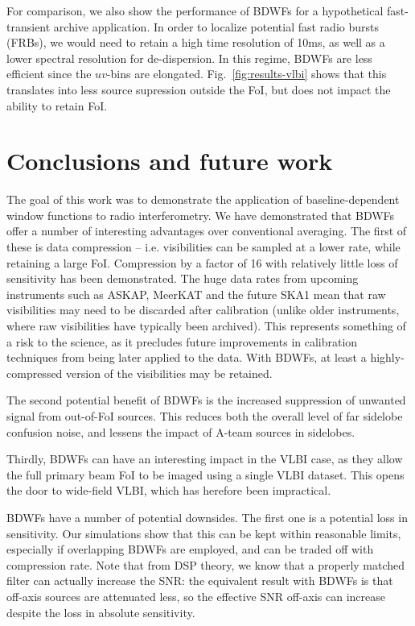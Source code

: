 \documentclass[useAMS,usenatbib]{mn2e}
\begin{document}
For comparison, we also show the performance of BDWFs for a hypothetical fast-transient archive application. In 
order to localize potential fast radio bursts (FRBs), we would need to retain a high time resolution of 10ms, as 
well as a lower spectral resolution for de-dispersion. In this regime, BDWFs are less efficient since the 
$uv$-bins are elongated. Fig.~\ref{fig:results-vlbi} shows that this translates into less source supression outside the FoI, but does not impact the ability to retain FoI.

\section{Conclusions and future work}

The goal of this work was to demonstrate the application of baseline-dependent window functions to radio 
interferometry. We have demonstrated that BDWFs offer a number of interesting advantages over conventional averaging.
The first of these is data compression -- i.e. visibilities can be sampled at a
lower rate, while retaining a large FoI. Compression by a factor of 16 with relatively little loss of sensitivity has been demonstrated. The huge data 
rates from upcoming instruments such as ASKAP, MeerKAT and the future SKA1 mean that raw visibilities may need to be
discarded after calibration (unlike older instruments, where raw visibilities have typically been archived). This 
represents something of a risk to the science, as it precludes future improvements in calibration techniques from 
being later applied to the data. With BDWFs, at least a highly-compressed version of the visibilities may be retained.

The second potential benefit of BDWFs is the increased suppression of unwanted signal from out-of-FoI sources. This
reduces both the overall level of far sidelobe confusion noise, and lessens the impact of A-team sources in sidelobes.

Thirdly, BDWFs can have an interesting impact in the VLBI case, as they allow the full primary beam FoI to be 
imaged using a single VLBI dataset. This opens the door to wide-field VLBI, which has herefore been impractical.

BDWFs have a number of potential downsides. The first one is a potential loss in sensitivity. Our simulations show 
that this can be kept within reasonable limits, especially if overlapping BDWFs are employed, and can be traded off with
compression rate. Note that from DSP theory, we know that a properly matched filter can actually increase the SNR: the equivalent
result with BDWFs is that off-axis sources are attenuated less, so the effective SNR off-axis can increase despite the 
loss in absolute sensitivity.
\end{document}
